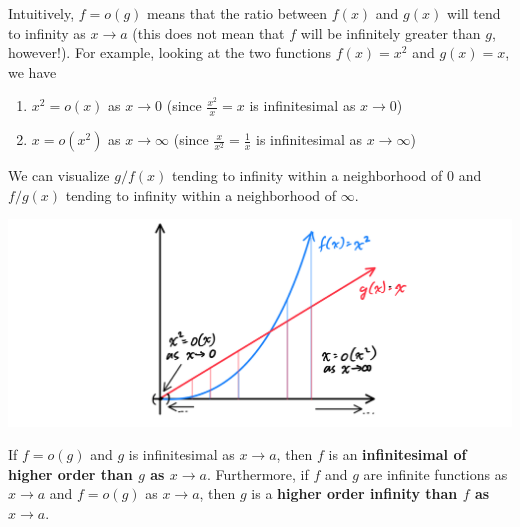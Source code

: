 \documentclass{article}
\begin{document}
    Intuitively, $f = o(g)$ means that the ratio between $f(x)$ and $g(x)$ will tend to infinity as $x \rightarrow a$ (this does not mean that $f$ will be infinitely greater than $g$, however!). For example, looking at the two functions $f(x) = x^2$ and $g(x) = x$, we have 
    \begin{enumerate}
      \item $x^2 = o(x)$ as $x \rightarrow 0$ (since $\frac{x^2}{x} = x$ is infinitesimal as $x \rightarrow 0$)
      \item $x = o(x^2)$ as $x \rightarrow \infty$ (since $\frac{x}{x^2} = \frac{1}{x}$ is infinitesimal as $x \rightarrow \infty$)
    \end{enumerate}
    We can visualize $g/f (x)$ tending to infinity within a neighborhood of $0$ and $f/g (x)$ tending to infinity within a neighborhood of $\infty$. 
    \begin{center}
        \includegraphics[scale=0.25]{img/Comparison_of_Quadratic_and_Linear.PNG}
    \end{center}

    \begin{definition}
      If $f = o(g)$ and $g$ is infinitesimal as $x \rightarrow a$, then $f$ is an \textbf{infinitesimal of higher order than $g$ as $x \rightarrow a$}. Furthermore, if $f$ and $g$ are infinite functions as $x\rightarrow a$ and $f = o(g)$ as $x \rightarrow a$, then $g$ is a \textbf{higher order infinity than $f$ as $x \rightarrow a$}. 
    \end{definition}
\end{document}
